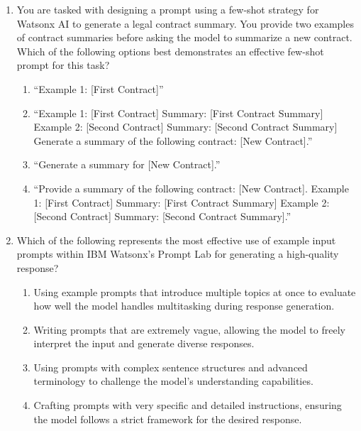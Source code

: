 \begin{enumerate}[resume,leftmargin=*]
\begin{enumerate}[label=\Alph*.]
  \item Temperature: 0.1, Random Seed: 42
  \item Temperature: 1.0, Random Seed: 0
  \item Temperature: 0.7, Random Seed: None
  \item Temperature: 1.5, Random Seed: 123
\end{enumerate}
\item You are tasked with designing a prompt using a few-shot strategy for Watsonx AI to generate a legal contract summary. You provide two examples of contract summaries before asking the model to summarize a new contract. Which of the following options best demonstrates an effective few-shot prompt for this task?
\begin{enumerate}[label=\Alph*.]
  \item ``Example 1: [First Contract]''
  \item ``Example 1: [First Contract] Summary: [First Contract Summary] Example 2: [Second Contract] Summary: [Second Contract Summary] Generate a summary of the following contract: [New Contract].''
  \item ``Generate a summary for [New Contract].''
  \item ``Provide a summary of the following contract: [New Contract]. Example 1: [First Contract] Summary: [First Contract Summary] Example 2: [Second Contract] Summary: [Second Contract Summary].''
\end{enumerate}
\item Which of the following represents the most effective use of example input prompts within IBM Watsonx's Prompt Lab for generating a high-quality response?
\begin{enumerate}[label=\Alph*.]
  \item Using example prompts that introduce multiple topics at once to evaluate how well the model handles multitasking during response generation.
  \item Writing prompts that are extremely vague, allowing the model to freely interpret the input and generate diverse responses.
  \item Using prompts with complex sentence structures and advanced terminology to challenge the model's understanding capabilities.
  \item Crafting prompts with very specific and detailed instructions, ensuring the model follows a strict framework for the desired response.
\end{enumerate}
\end{enumerate}

